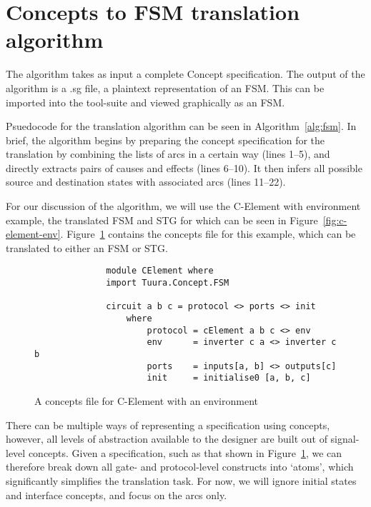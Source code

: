 \section{Concepts to FSM translation algorithm}\label{sec:algorithm}

The algorithm takes as input a complete Concept specification.
The output of the algorithm is a .sg file, a plaintext representation of an FSM\@.
This can be imported into the  tool-suite and viewed graphically as an FSM\@.

Psuedocode for the translation algorithm can be seen in Algorithm~\ref{alg:fsm}.
In brief, the algorithm begins by preparing the concept specification for the translation by combining the lists of arcs in a certain way (lines 1--5), 
and directly extracts pairs of causes and effects (lines 6--10).
It then infers all possible source and destination states with associated arcs (lines 11--22).

For our discussion of the algorithm, we will use the C-Element with environment 
example, the translated FSM and STG for which can be seen in 
Figure~\ref{fig:c-element-env}. Figure~\ref{fig:concepts_file} contains the 
concepts file for this example, which can be translated to either an FSM or STG. 

\begin{figure}[H]
	\centering
		\begin{verbatim}
        	  module CElement where
        	  import Tuura.Concept.FSM

        	  circuit a b c = protocol <> ports <> init 
            	  where
                	  protocol = cElement a b c <> env
                	  env      = inverter c a <> inverter c b
                	  ports    = inputs[a, b] <> outputs[c] 
                	  init     = initialise0 [a, b, c]
		\end{verbatim}
	\vspace{-5mm}
	\begin{centering}
		\protect\caption{\label{fig:concepts_file}A concepts file for C-Element with an environment}
		\par\end{centering}
	
\end{figure}

There can be multiple ways of representing a specification using concepts, 
however, all levels of abstraction available to the designer are built out of signal-level
concepts. Given a specification, such as that shown in Figure~\ref{fig:concepts_file}, we can 
therefore break down 
all gate- and protocol-level constructs into `atoms', which significantly 
simplifies the translation task. For now, we will ignore initial states and interface
concepts, and focus on the arcs only.

